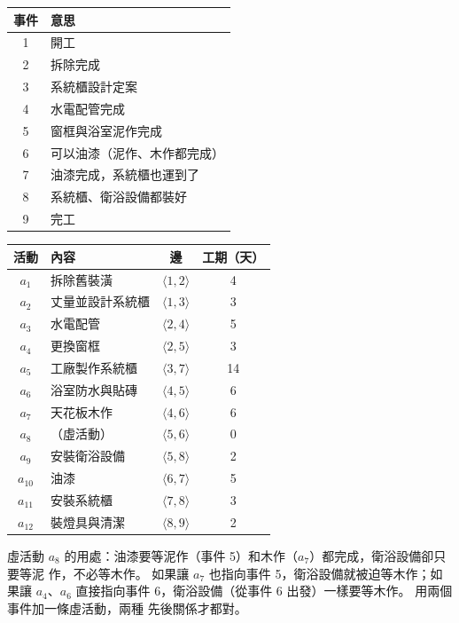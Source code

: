 \begin{center}
\small
\begin{tabular}[t]{cl}
\toprule
事件 & 意思 \\
\midrule
1 & 開工 \\
2 & 拆除完成 \\
3 & 系統櫃設計定案 \\
4 & 水電配管完成 \\
5 & 窗框與浴室泥作完成 \\
6 & 可以油漆（泥作、木作都完成） \\
7 & 油漆完成，系統櫃也運到了 \\
8 & 系統櫃、衛浴設備都裝好 \\
9 & 完工 \\
\bottomrule
\end{tabular}\hspace{1.5em}%
\begin{tabular}[t]{clcc}
\toprule
活動 & 內容 & 邊 & 工期（天） \\
\midrule
$a_1$ & 拆除舊裝潢 & $\langle 1, 2 \rangle$ & 4 \\
$a_2$ & 丈量並設計系統櫃 & $\langle 1, 3 \rangle$ & 3 \\
$a_3$ & 水電配管 & $\langle 2, 4 \rangle$ & 5 \\
$a_4$ & 更換窗框 & $\langle 2, 5 \rangle$ & 3 \\
$a_5$ & 工廠製作系統櫃 & $\langle 3, 7 \rangle$ & 14 \\
$a_6$ & 浴室防水與貼磚 & $\langle 4, 5 \rangle$ & 6 \\
$a_7$ & 天花板木作 & $\langle 4, 6 \rangle$ & 6 \\
$a_8$ & （虛活動） & $\langle 5, 6 \rangle$ & 0 \\
$a_9$ & 安裝衛浴設備 & $\langle 5, 8 \rangle$ & 2 \\
$a_{10}$ & 油漆 & $\langle 6, 7 \rangle$ & 5 \\
$a_{11}$ & 安裝系統櫃 & $\langle 7, 8 \rangle$ & 3 \\
$a_{12}$ & 裝燈具與清潔 & $\langle 8, 9 \rangle$ & 2 \\
\bottomrule
\end{tabular}
\end{center}

虛活動 $a_8$ 的用處：油漆要等泥作（事件 5）和木作（$a_7$）都完成，衛浴設備卻只要等泥
作，不必等木作。 如果讓 $a_7$ 也指向事件 5，衛浴設備就被迫等木作；如果讓 $a_4$、$a_6$
直接指向事件 6，衛浴設備（從事件 6 出發）一樣要等木作。 用兩個事件加一條虛活動，兩種
先後關係才都對。

